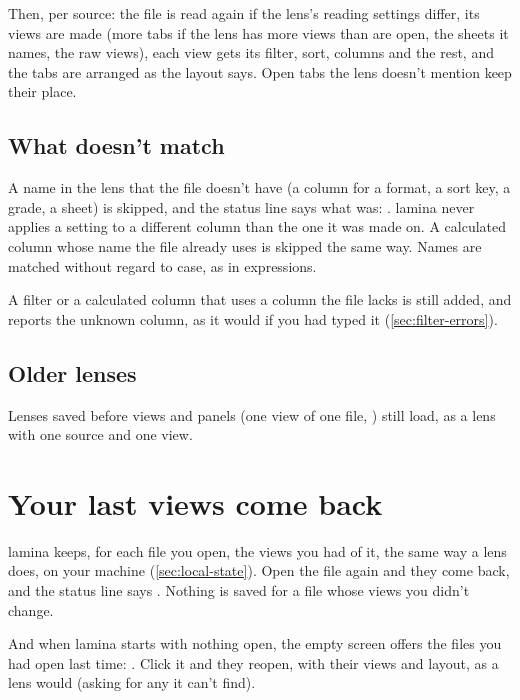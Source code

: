 Then, per source: the file is read again if the lens's reading settings differ, its views are made (more
tabs if the lens has more views than are open, the sheets it names, the raw views), each view gets its
filter, sort, columns and the rest, and the tabs are arranged as the layout says. Open tabs the lens
doesn't mention keep their place.

\subsection{What doesn't match}\label{sec:lens-skips}

A name in the lens that the file doesn't have (a column for a format, a sort key, a grade, a sheet) is
skipped, and the status line says what was: .
lamina never applies a setting to a different column than the one it was made on. A calculated column
whose name the file already uses is skipped the same way. Names are matched without regard to case, as
in expressions.

A filter or a calculated column that uses a column the file lacks is still added, and reports the unknown
column, as it would if you had typed it (\cref{sec:filter-errors}).

\subsection{Older lenses}

Lenses saved before views and panels (one view of one file, ) still load, as a lens with
one source and one view.

\section{Your last views come back}\label{sec:last-views}

lamina keeps, for each file you open, the views you had of it, the same way a lens does, on your machine
(\cref{sec:local-state}). Open the file again and they come back, and the status line says
. Nothing is saved for a file whose views you didn't
change.

And when lamina starts with nothing open, the empty screen offers the files you had open last time:
. Click it and they reopen,
with their views and layout, as a lens would (asking for any it can't find).

